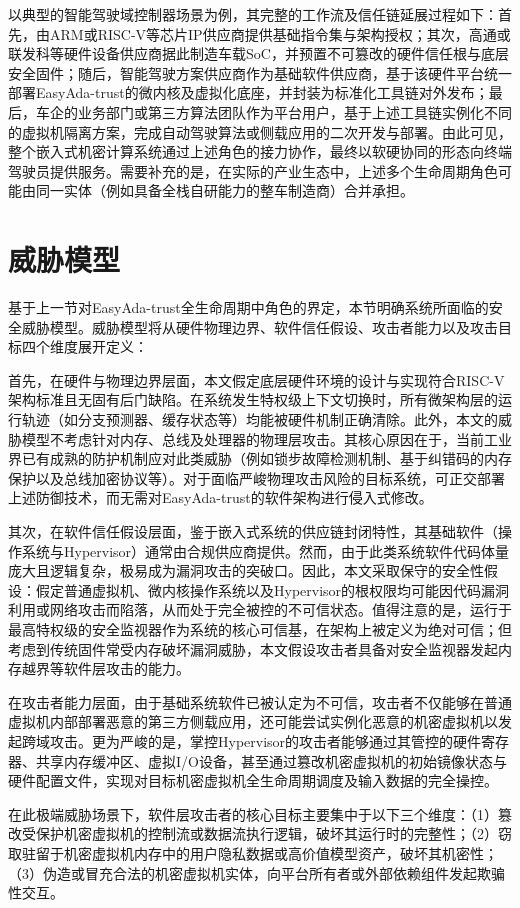 \documentclass[master, vlined, review]{DissertUESTC}
\begin{document}
	以典型的智能驾驶域控制器场景为例，其完整的工作流及信任链延展过程如下：首先，由ARM或RISC-V等芯片IP供应商提供基础指令集与架构授权；其次，高通或联发科等硬件设备供应商据此制造车载SoC，并预置不可篡改的硬件信任根与底层安全固件；随后，智能驾驶方案供应商作为基础软件供应商，基于该硬件平台统一部署EasyAda-trust的微内核及虚拟化底座，并封装为标准化工具链对外发布；最后，车企的业务部门或第三方算法团队作为平台用户，基于上述工具链实例化不同的虚拟机隔离方案，完成自动驾驶算法或侧载应用的二次开发与部署。由此可见，整个嵌入式机密计算系统通过上述角色的接力协作，最终以软硬协同的形态向终端驾驶员提供服务。需要补充的是，在实际的产业生态中，上述多个生命周期角色可能由同一实体（例如具备全栈自研能力的整车制造商）合并承担。
	\section{威胁模型}
	基于上一节对EasyAda-trust全生命周期中角色的界定，本节明确系统所面临的安全威胁模型。威胁模型将从硬件物理边界、软件信任假设、攻击者能力以及攻击目标四个维度展开定义：
	
	首先，在硬件与物理边界层面，本文假定底层硬件环境的设计与实现符合RISC-V架构标准且无固有后门缺陷。在系统发生特权级上下文切换时，所有微架构层的运行轨迹（如分支预测器、缓存状态等）均能被硬件机制正确清除。此外，本文的威胁模型不考虑针对内存、总线及处理器的物理层攻击。其核心原因在于，当前工业界已有成熟的防护机制应对此类威胁（例如锁步故障检测机制、基于纠错码的内存保护以及总线加密协议等）。对于面临严峻物理攻击风险的目标系统，可正交部署上述防御技术，而无需对EasyAda-trust的软件架构进行侵入式修改。
	
	其次，在软件信任假设层面，鉴于嵌入式系统的供应链封闭特性，其基础软件（操作系统与Hypervisor）通常由合规供应商提供。然而，由于此类系统软件代码体量庞大且逻辑复杂，极易成为漏洞攻击的突破口。因此，本文采取保守的安全性假设：假定普通虚拟机、微内核操作系统以及Hypervisor的根权限均可能因代码漏洞利用或网络攻击而陷落，从而处于完全被控的不可信状态。值得注意的是，运行于最高特权级的安全监视器作为系统的核心可信基，在架构上被定义为绝对可信；但考虑到传统固件常受内存破坏漏洞威胁，本文假设攻击者具备对安全监视器发起内存越界等软件层攻击的能力。
	
	在攻击者能力层面，由于基础系统软件已被认定为不可信，攻击者不仅能够在普通虚拟机内部部署恶意的第三方侧载应用，还可能尝试实例化恶意的机密虚拟机以发起跨域攻击。更为严峻的是，掌控Hypervisor的攻击者能够通过其管控的硬件寄存器、共享内存缓冲区、虚拟I/O设备，甚至通过篡改机密虚拟机的初始镜像状态与硬件配置文件，实现对目标机密虚拟机全生命周期调度及输入数据的完全操控。
	
	在此极端威胁场景下，软件层攻击者的核心目标主要集中于以下三个维度：（1）篡改受保护机密虚拟机的控制流或数据流执行逻辑，破坏其运行时的完整性；（2）窃取驻留于机密虚拟机内存中的用户隐私数据或高价值模型资产，破坏其机密性；（3）伪造或冒充合法的机密虚拟机实体，向平台所有者或外部依赖组件发起欺骗性交互。
\end{document}
